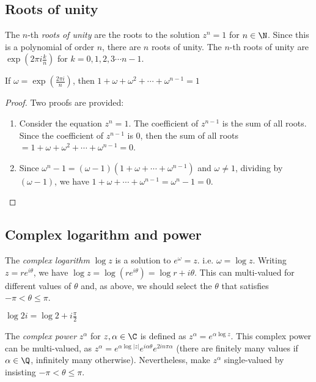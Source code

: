 \documentclass[a4paper]{article}
\begin{document}
\subsection{Roots of unity}
\begin{defi}
  The $n$-th \emph{roots of unity} are the roots to the solution $z^n = 1$ for $n\in \N$. Since this is a polynomial of order $n$, there are $n$ roots of unity. The $n$-th roots of unity are $\exp\left(2\pi i\frac{k}{n}\right)$ for $k = 0, 1, 2, 3\cdots n - 1$.
\end{defi}

\begin{prop}
  If $\omega = \exp\left(\frac{2\pi i}{n}\right)$, then $1 + \omega + \omega^2 + \cdots + \omega^{n - 1} = 1$
\end{prop}

\begin{proof}
  Two proofs are provided:
  \begin{enumerate}
  \item Consider the equation $z^n = 1$. The coefficient of $z^{n-1}$ is the sum of all roots. Since the coefficient of $z^{n-1}$ is 0, then the sum of all roots $= 1 + \omega + \omega^2 + \cdots + \omega^{n-1} = 0$.
  \item Since $\omega^n - 1 = (\omega - 1)(1 + \omega + \cdots + \omega^{n - 1})$ and $\omega \not= 1$, dividing by $(\omega - 1)$, we have $1 + \omega + \cdots + \omega^{n-1} = \omega^n - 1 = 0$.
  \end{enumerate}
\end{proof}

\subsection{Complex logarithm and power}
\begin{defi}
  The \emph{complex logarithm} $\log z$ is a solution to $e^\omega = z$. i.e. $\omega = \log z$. Writing $z = re^{i\theta}$, we have $\log z = \log(re^{i\theta}) = \log r + i\theta$. This can multi-valued for different values of $\theta$ and, as above, we should select the $\theta$ that satisfies $-\pi < \theta \leq \pi$.
\end{defi}
\begin{eg}
  $\log 2i = \log 2 + i\frac{\pi}{2}$
\end{eg}

\begin{defi}
  The \emph{complex power} $z^\alpha$ for $z, \alpha\in \C$ is defined as $z^\alpha = e^{\alpha\log z}$. This complex power can be multi-valued, as $z^\alpha = e^{\alpha\log|z|}e^{i\alpha\theta}e^{2in\pi\alpha}$ (there are finitely many values if $\alpha\in\Q$, infinitely many otherwise). Nevertheless, make $z^\alpha$ single-valued by insisting $-\pi < \theta \leq \pi$.
\end{defi}
\end{document}

